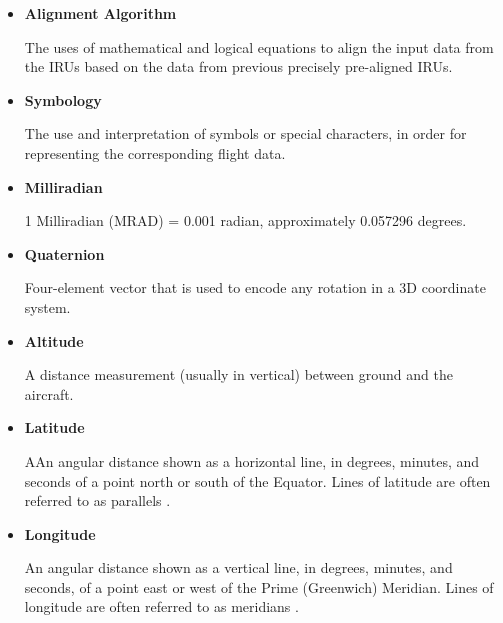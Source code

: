 \begin{itemize}
 	\item \textbf{Alignment Algorithm}
 	\begin{adjustwidth}{2.5em}{0pt}
	The uses of mathematical and logical equations to align the input data from the IRUs based on the data from previous precisely pre-aligned IRUs.
	\\
 	\end{adjustwidth}

 	\item \textbf{Symbology}
 	\begin{adjustwidth}{2.5em}{0pt}
	The use and interpretation of symbols or special characters, in order for representing the corresponding flight data.
	\\
 	\end{adjustwidth}

 	\item \textbf{Milliradian}
 	\begin{adjustwidth}{2.5em}{0pt}
	1 Milliradian (MRAD) = 0.001 radian, approximately 0.057296 degrees.
	\\
 	\end{adjustwidth}

 	\item \textbf{Quaternion}
 	\begin{adjustwidth}{2.5em}{0pt}
	Four-element vector that is used to encode any rotation in a 3D coordinate system.
	\\
 	\end{adjustwidth}

 	\item \textbf{Altitude}
 	\begin{adjustwidth}{2.5em}{0pt}
	A distance measurement (usually in vertical) between ground and the aircraft.\\
 	\end{adjustwidth}

 	\item \textbf{Latitude}
 	\begin{adjustwidth}{2.5em}{0pt}
	AAn angular distance shown as a horizontal line, in degrees, minutes, and seconds of a point north or south of the Equator. Lines of latitude are often referred to as parallels \cite{latAndLong}.
	\\
 	\end{adjustwidth}

 	\item \textbf{Longitude}
 	\begin{adjustwidth}{2.5em}{0pt}
	An angular distance shown as a vertical line, in degrees, minutes, and seconds, of a point east or west of the Prime (Greenwich) Meridian. Lines of longitude are often referred to as meridians \cite{latAndLong}.
 	\end{adjustwidth}
\end{itemize}


